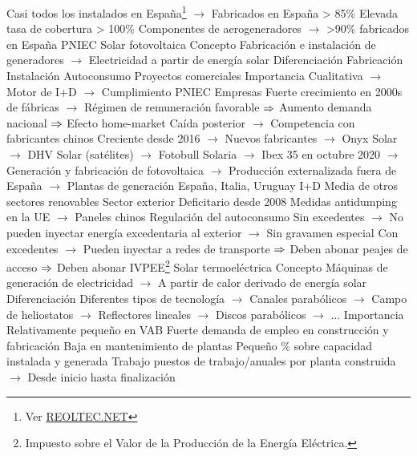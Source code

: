 \documentclass{nuevotema}
\begin{document}
\begin{esquemal}
				\4[] Casi todos los instalados en España\footnote{Ver \href{https://reoltec.net/la-industria-eolica-espanola/}{REOLTEC.NET}}
				\4[] $\to$ Fabricados en España > 85\%
				\4[] Elevada tasa de cobertura > 100\%
				\4[] Componentes de aerogeneradores
				\4[] $\to$ >90\% fabricados en España
				\4 PNIEC
			\3 Solar fotovoltaica
				\4 Concepto
				\4[] Fabricación e instalación de generadores
				\4[] $\to$ Electricidad a partir de energía solar
				\4 Diferenciación
				\4[] Fabricación
				\4[] Instalación
				\4[] Autoconsumo
				\4[] Proyectos comerciales
				\4 Importancia
				\4[] Cualitativa
				\4[] $\to$ Motor de I+D
				\4[] $\to$ Cumplimiento PNIEC
				\4 Empresas
				\4[] Fuerte crecimiento en 2000s de fábricas
				\4[] $\to$ Régimen de remuneración favorable
				\4[] $\Rightarrow$ Aumento demanda nacional
				\4[] $\Rightarrow$ Efecto home-market
				\4[] Caída posterior
				\4[] $\to$ Competencia con fabricantes chinos
				\4[] Creciente desde 2016
				\4[] $\to$ Nuevos fabricantes
				\4[] $\to$ Onyx Solar
				\4[] $\to$ DHV Solar (satélites)
				\4[] $\to$ Fotobull
				\4[] Solaria
				\4[] $\to$ Ibex 35 en octubre 2020
				\4[] $\to$ Generación y fabricación de fotovoltaica
				\4[] $\to$ Producción externalizada fuera de España
				\4[] $\to$ Plantas de generación España, Italia, Uruguay
				\4 I+D
				\4[] Media de otros sectores renovables
				\4 Sector exterior
				\4[] Deficitario desde 2008
				\4[] Medidas antidumping en la UE
				\4[] $\to$ Paneles chinos
				\4 Regulación del autoconsumo
				\4[] Sin excedentes
				\4[] $\to$ No pueden inyectar energía excedentaria al exterior
				\4[] $\to$ Sin gravamen especial
				\4[] Con excedentes
				\4[] $\to$ Pueden inyectar a redes de transporte
				\4[] $\Rightarrow$ Deben abonar peajes de acceso
				\4[] $\Rightarrow$ Deben abonar IVPEE\footnote{Impuesto sobre el Valor de la Producción de la Energía Eléctrica.}
			\3 Solar termoeléctrica
				\4 Concepto
				\4[] Máquinas de generación de electricidad
				\4[] $\to$ A partir de calor derivado de energía solar
				\4 Diferenciación
				\4[] Diferentes tipos de tecnología
				\4[] $\to$ Canales parabólicos
				\4[] $\to$ Campo de heliostatos
				\4[] $\to$ Reflectores lineales
				\4[] $\to$ Discos parabólicos
				\4[] $\to$ ...
				\4 Importancia
				\4[] Relativamente pequeño en VAB
				\4[] Fuerte demanda de empleo en construcción y fabricación
				\4[] Baja en mantenimiento de plantas
				\4[] Pequeño \% sobre capacidad instalada y generada
				\4 Trabajo
				 puestos de trabajo/anuales por planta construida
				\4[] $\to$ Desde inicio hasta finalización

\end{esquemal}
\end{document}

